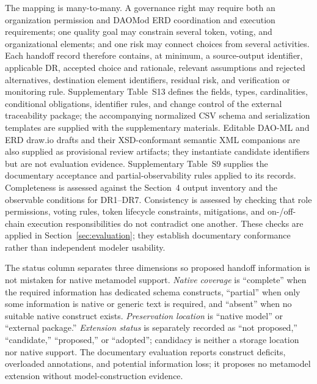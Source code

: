 \documentclass[referee,sn-basic]{sn-jnl}
\begin{document}
The mapping is many-to-many. A governance right may require both an
organization permission and DAOMod ERD coordination and execution requirements; one quality goal
may constrain several token, voting, and organizational elements; and one risk
may connect choices from several activities. Each handoff record therefore
contains, at minimum, a source-output identifier, applicable DR, accepted choice
and rationale, relevant assumptions and rejected alternatives, destination
element identifiers, residual risk, and verification or monitoring rule.
Supplementary Table~S13 defines the fields, types, cardinalities, conditional
obligations, identifier rules, and change control of the external traceability
package; the accompanying normalized CSV schema and serialization templates are supplied with the
supplementary materials. Editable DAO-ML and ERD draw.io drafts and their
XSD-conformant semantic XML companions are also supplied as provisional review
artifacts; they instantiate candidate identifiers but are not evaluation
evidence. Supplementary Table~S9 supplies the documentary
acceptance and partial-observability rules applied to its records.
Completeness is assessed against the Section~4 output inventory and the
observable conditions for DR1--DR7. Consistency is assessed by checking that
role permissions, voting rules, token lifecycle constraints, mitigations, and
on-/off-chain execution responsibilities do not contradict one another. These
checks are applied in Section~\ref{sec:evaluation}; they establish documentary
conformance rather than independent modeler usability.

The status column separates three dimensions so proposed handoff information is
not mistaken for native metamodel support. \emph{Native coverage} is
``complete'' when the required information has dedicated schema constructs,
``partial'' when only some information is native or generic text is required,
and ``absent'' when no suitable native construct exists. \emph{Preservation
location} is ``native model'' or ``external package.'' \emph{Extension status}
is separately recorded as ``not proposed,'' ``candidate,'' ``proposed,'' or
``adopted''; candidacy is neither a storage location nor native support.
The documentary
evaluation reports construct deficits, overloaded annotations, and potential
information loss; it proposes no metamodel extension without model-construction
evidence.
\end{document}
